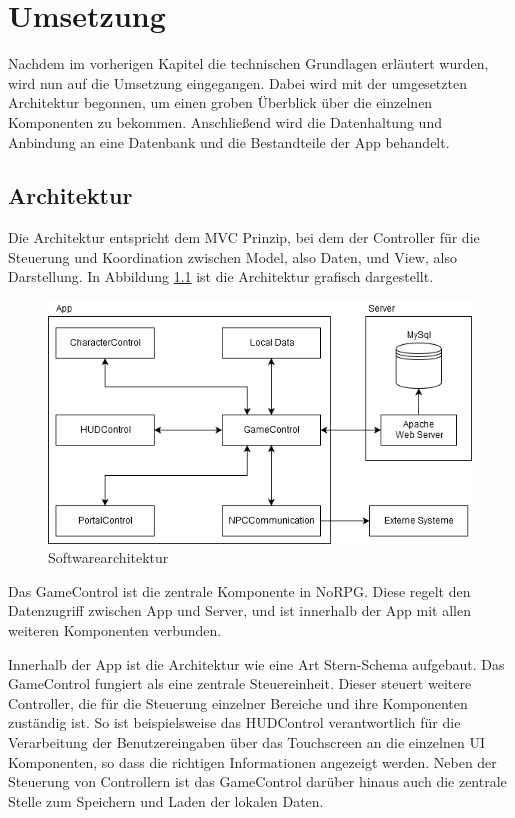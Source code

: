 \chapter{Umsetzung}
	Nachdem im vorherigen Kapitel die technischen Grundlagen erläutert wurden, wird nun auf die Umsetzung eingegangen. Dabei wird mit der umgesetzten Architektur begonnen, um einen groben Überblick über die einzelnen Komponenten zu bekommen. Anschließend wird die Datenhaltung und Anbindung an eine Datenbank und die Bestandteile der App behandelt.

	\section{Architektur}
		Die Architektur entspricht dem \ac{MVC} Prinzip, bei dem der Controller für die Steuerung und Koordination zwischen Model, also Daten, und View, also Darstellung. In Abbildung \ref{architecture} ist die Architektur grafisch dargestellt.

		\begin{figure}[htbp]
			\centering 
			\label{architecture}
			\includegraphics[width=13cm]{pics/archtecture.png}
			\caption{Softwarearchitektur}
		\end{figure}
	
		Das GameControl ist die zentrale Komponente in NoRPG. Diese regelt den Datenzugriff zwischen App und Server, und ist innerhalb der App mit allen weiteren Komponenten verbunden. 
		
		Innerhalb der App ist die Architektur wie eine Art Stern-Schema aufgebaut. Das GameControl fungiert als eine zentrale Steuereinheit. Dieser steuert weitere Controller, die für die Steuerung einzelner Bereiche und ihre Komponenten zuständig ist. So ist beispielsweise das HUDControl verantwortlich für die Verarbeitung der Benutzereingaben über das Touchscreen an die einzelnen UI Komponenten, so dass die richtigen Informationen angezeigt werden. Neben der Steuerung von Controllern ist das GameControl darüber hinaus auch die zentrale Stelle zum Speichern und Laden der lokalen Daten.
		
